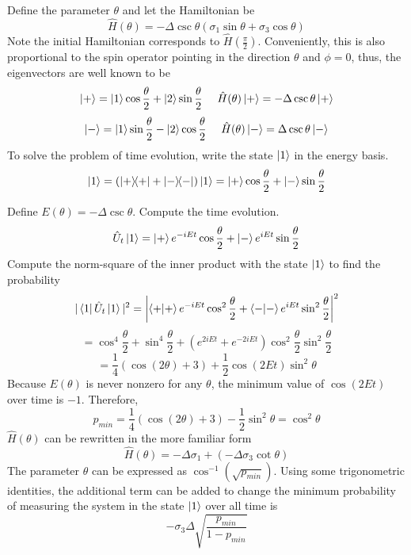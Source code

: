 \begin{sol}
Define the parameter $\theta$ and let the Hamiltonian be 
\begin{equation}
	\hat H(\theta)=-\Delta\csc\theta(\sigma_1\sin\theta+\sigma_3\cos\theta)
\end{equation}
Note the initial Hamiltonian corresponds to $\hat H(\frac{\pi}{2})$. Conveniently, this is also proportional to the spin operator pointing in the direction $\theta$ and $\phi=0$, thus, the eigenvectors are well known to be
\begin{equation}
	\ket+= \ket1\cos\frac{\theta}{2}+\ket2\sin\frac{\theta}{2}\:\:\:\:\:\:\hat H(\theta)\ket+=-\Delta\csc\theta\ket+
\end{equation} \begin{equation}
	\ket-= \ket1\sin\frac{\theta}{2}-\ket2\cos\frac{\theta}{2}\:\:\:\:\:\:\hat H(\theta)\ket-=\Delta\csc\theta\ket-
\end{equation} 
To solve the problem of time evolution, write the state $\ket1$ in the energy basis.
\begin{equation}
	\ket1=(\ketbra{+}{+}+\ketbra{-}{-})\ket1=\ket+\cos\frac{\theta}{2}+\ket-\sin\frac{\theta}{2}
\end{equation}

Define $E(\theta)=-\Delta\csc\theta$. Compute the time evolution.
\begin{equation}
	\hat U_t\ket1=\ket+e^{-iEt}\cos\frac{\theta}{2}+\ket-e^{iEt}\sin\frac{\theta}{2}
\end{equation}
Compute the norm-square of the inner product with the state $\ket1$ to find the probability
\begin{equation}
	|\bra1\hat U_t\ket1|^2=\left|\braket{+}{+}e^{-iEt}\cos^2\frac{\theta}{2}+\braket{-}{-}e^{iEt}\sin^2\frac{\theta}{2}\right|^2
\end{equation} 
\begin{equation}
	=\cos^4\frac{\theta}{2}+\sin^4\frac{\theta}{2}+(e^{2iEt}+e^{-2iEt})\cos^2\frac{\theta}{2}\sin^2\frac{\theta}{2}
\end{equation} 
\begin{equation}
	=\frac{1}{4}(\cos(2\theta)+3)+\frac{1}{2}\cos(2Et)\sin^2\theta
\end{equation}
Because $E(\theta)$ is never nonzero for any $\theta$, the minimum value of $\cos(2Et)$ over time is $-1$. Therefore,
\begin{equation}
	p_{min}=\frac{1}{4}(\cos(2\theta)+3)-\frac{1}{2}\sin^2\theta=\cos^2\theta
\end{equation}
$\hat H(\theta)$ can be rewritten in the more familiar form
\begin{equation}
	\hat H(\theta)=-\Delta\sigma_1+(-\Delta\sigma_3\cot\theta)
\end{equation}
The parameter $\theta$ can be expressed as $\cos^{-1}(\sqrt{p_{min}})$. Using some trigonometric identities, the additional term can be added to change the minimum probability of measuring the system in the state $\ket1$ over all time is
\begin{equation}
	-\sigma_3\Delta\sqrt{\frac{p_{min}}{1-p_{min}}}
\end{equation} 

\end{sol}